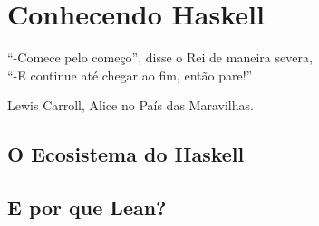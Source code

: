 \chapter{Conhecendo Haskell}\label{cap:IntroLean}

\epigraph{``-Comece pelo começo'', disse o Rei de maneira severa,\\ ``-E continue até chegar ao fim, então pare!''}{Lewis Carroll, Alice no País das Maravilhas.}

\section{O Ecosistema do Haskell}

\section{E por que Lean?}



